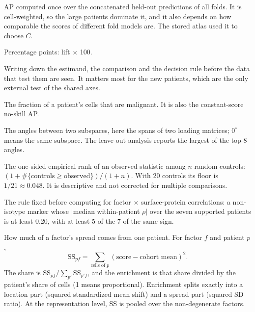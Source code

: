 \begin{description}[leftmargin=0pt,itemsep=3pt,font=\normalfont\bfseries]
\item[Pooled LOPO AP.] AP computed once over the concatenated held-out predictions of all folds. It is cell-weighted, so the large patients dominate it, and it also depends on how comparable the scores of different fold models are. The stored atlas used it to choose $C$.

\item[pp.] Percentage points: lift $\times$ 100.

\item[Pre-registration.] Writing down the estimand, the comparison and the decision rule before the data that test them are seen. It matters most for the new patients, which are the only external test of the shared axes.

\item[Prevalence ($\pi$).] The fraction of a patient's cells that are malignant. It is also the constant-score no-skill AP.

\item[Principal angle.] The angles between two subspaces, here the spans of two loading matrices; $0^\circ$ means the same subspace. The leave-out analysis reports the largest of the top-8 angles.

\item[Rank $p$.] The one-sided empirical rank of an observed statistic among $n$ random controls: $(1+\#\{\text{controls}\geq\text{observed}\})/(1+n)$. With 20 controls its floor is $1/21\approx0.048$. It is descriptive and not corrected for multiple comparisons.

\item[Robust association.] The rule fixed before computing for factor $\times$ surface-protein correlations: a non-isotype marker whose $|$median within-patient $\rho|$ over the seven supported patients is at least 0.20, with at least 5 of the 7 of the same sign.

\item[Score energy share, enrichment.] How much of a factor's spread comes from one patient. For factor $f$ and patient $p$,
\[\mathrm{SS}_{pf}=\textstyle\sum_{\text{cells of }p}(\text{score}-\text{cohort mean})^2 .\]
The share is $\mathrm{SS}_{pf}/\sum_{p'}\mathrm{SS}_{p'f}$, and the enrichment is that share divided by the patient's share of cells (1 means proportional). Enrichment splits exactly into a location part (squared standardized mean shift) and a spread part (squared SD ratio). At the representation level, SS is pooled over the non-degenerate factors.


\end{description}
